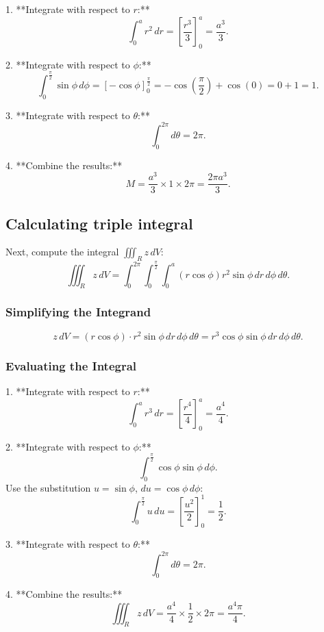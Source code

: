 \documentclass[11pt]{article}
\begin{document}
1. **Integrate with respect to \( r \):**
\[
\int_{0}^{a} r^2 \, dr = \left[ \frac{r^3}{3} \right]_{0}^{a} = \frac{a^3}{3}.
\]

2. **Integrate with respect to \( \phi \):**
\[
\int_{0}^{\frac{\pi}{2}} \sin\phi \, d\phi = \left[ -\cos\phi \right]_{0}^{\frac{\pi}{2}} = -\cos\left(\frac{\pi}{2}\right) + \cos(0) = 0 + 1 = 1.
\]

3. **Integrate with respect to \( \theta \):**
\[
\int_{0}^{2\pi} d\theta = 2\pi.
\]

4. **Combine the results:**
\[
M = \frac{a^3}{3} \times 1 \times 2\pi = \frac{2\pi a^3}{3}.
\]

\newpage

\subsection{Calculating triple integral}

Next, compute the integral \( \iiint_{R} z \, dV \):
\[
\iiint_{R} z \, dV = \int_{0}^{2\pi} \int_{0}^{\frac{\pi}{2}} \int_{0}^{a} (r \cos\phi) r^2 \sin\phi \, dr \, d\phi \, d\theta.
\]

\subsubsection{Simplifying the Integrand}

\[
z \, dV = (r \cos\phi) \cdot r^2 \sin\phi \, dr \, d\phi \, d\theta = r^3 \cos\phi \sin\phi \, dr \, d\phi \, d\theta.
\]

\subsubsection{Evaluating the Integral}

1. **Integrate with respect to \( r \):**
\[
\int_{0}^{a} r^3 \, dr = \left[ \frac{r^4}{4} \right]_{0}^{a} = \frac{a^4}{4}.
\]

2. **Integrate with respect to \( \phi \):**
\[
\int_{0}^{\frac{\pi}{2}} \cos\phi \sin\phi \, d\phi.
\]
Use the substitution \( u = \sin\phi \), \( du = \cos\phi \, d\phi \):
\[
\int_{0}^{\frac{\pi}{2}} u \, du = \left[ \frac{u^2}{2} \right]_{0}^{1} = \frac{1}{2}.
\]

3. **Integrate with respect to \( \theta \):**
\[
\int_{0}^{2\pi} d\theta = 2\pi.
\]

4. **Combine the results:**
\[
\iiint_{R} z \, dV = \frac{a^4}{4} \times \frac{1}{2} \times 2\pi = \frac{a^4 \pi}{4}.
\]
\end{document}
